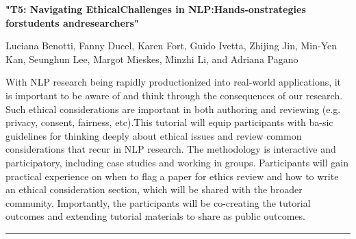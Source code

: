 \begin{center}
    \Large{\textbf{"T5: Navigating EthicalChallenges in NLP:Hands-onstrategies forstudents andresearchers"}\\}
    \par\bigskip
    \large{Luciana Benotti, Fanny Ducel, Karen Fort, Guido Ivetta, Zhijing Jin, Min-Yen Kan,
Seunghun Lee, Margot Mieskes, Minzhi Li, and Adriana Pagano}\\
    \par\bigskip

\end{center}

With NLP research being rapidly productionized into real-world applications, it is important to be aware of and think through the consequences of our research. Such ethical considerations are important in both authoring and reviewing (e.g. privacy, consent, fairness, etc).This tutorial will equip participants with ba-sic guidelines for thinking deeply about ethical issues and review common considerations that recur in NLP research. The methodology is interactive and participatory, including case studies and working in groups. Participants will gain practical experience on when to flag a paper for ethics review and how to write an ethical consideration section, which will be shared with the broader community. Importantly, the participants will be co-creating the tutorial outcomes and extending tutorial materials to share as public outcomes.

\begin{center}
    \noindent\rule{200px}{1pt}
\end{center}
